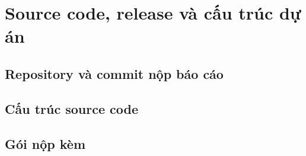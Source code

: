 \chapter{Source code, release và cấu trúc dự án}

\section{Repository và commit nộp báo cáo}

\section{Cấu trúc source code}

\section{Gói nộp kèm}
